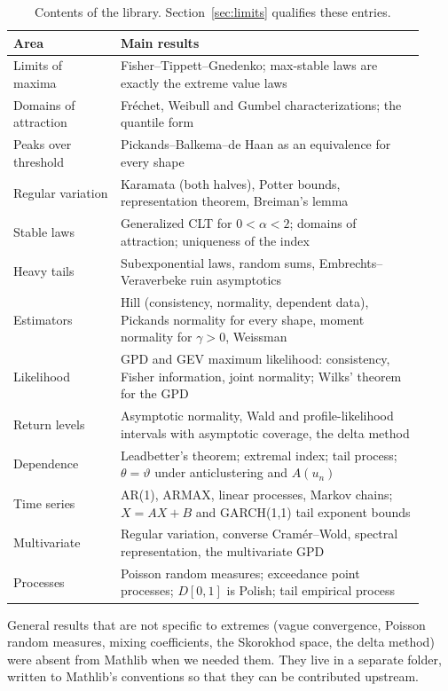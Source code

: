 \documentclass[11pt]{article}
\begin{document}
\begin{table}[ht]
\centering\small
\begin{tabular}{p{0.24\linewidth}p{0.68\linewidth}}
\toprule
Area & Main results \\
\midrule
Limits of maxima & Fisher--Tippett--Gnedenko; max-stable laws are exactly the extreme value laws \\
Domains of attraction & Fr\'echet, Weibull and Gumbel characterizations; the quantile form \\
Peaks over threshold & Pickands--Balkema--de Haan as an equivalence for every shape \\
Regular variation & Karamata (both halves), Potter bounds, representation theorem, Breiman's lemma \\
Stable laws & Generalized CLT for $0<\alpha<2$; domains of attraction; uniqueness of the index \\
Heavy tails & Subexponential laws, random sums, Embrechts--Veraverbeke ruin asymptotics \\
Estimators & Hill (consistency, normality, dependent data), Pickands normality for every shape, moment normality for $\gamma>0$, Weissman \\
Likelihood & GPD and GEV maximum likelihood: consistency, Fisher information, joint normality; Wilks' theorem for the GPD \\
Return levels & Asymptotic normality, Wald and profile-likelihood intervals with asymptotic coverage, the delta method \\
Dependence & Leadbetter's theorem; extremal index; tail process; $\theta=\vartheta$ under anticlustering and $A(u_n)$ \\
Time series & AR(1), ARMAX, linear processes, Markov chains; $X=AX+B$ and GARCH(1,1) tail exponent bounds \\
Multivariate & Regular variation, converse Cram\'er--Wold, spectral representation, the multivariate GPD \\
Processes & Poisson random measures; exceedance point processes; $D[0,1]$ is Polish; tail empirical process \\
\bottomrule
\end{tabular}
\caption{Contents of the library. Section~\ref{sec:limits} qualifies these entries.}
\label{tab:contents}
\end{table}

General results that are not specific to extremes (vague convergence, Poisson random measures, mixing
coefficients, the Skorokhod space, the delta method) were absent from Mathlib when we needed them. They
live in a separate folder, written to Mathlib's conventions so that they can be contributed upstream.
\end{document}
